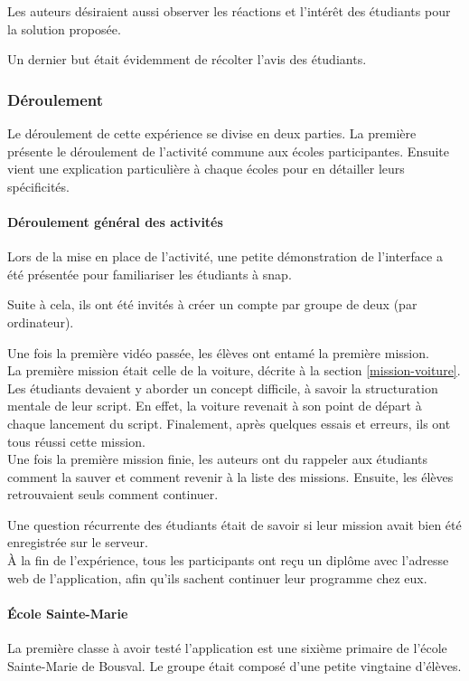 Les auteurs désiraient aussi observer les réactions et l'intérêt des étudiants pour la solution proposée.

Un dernier but était évidemment de récolter l'avis des étudiants.

\subsubsection{Déroulement}
Le déroulement de cette expérience se divise en deux parties. La première présente le déroulement de l'activité commune aux écoles participantes. Ensuite vient une explication particulière à chaque écoles pour en détailler leurs spécificités.
\paragraph{Déroulement général des activités}
Lors de la mise en place de l'activité, une petite démonstration de l'interface a été présentée pour familiariser les étudiants à \gls{snap}.

Suite à cela, ils ont été invités à créer un compte par groupe de deux (par ordinateur).

Une fois la première vidéo passée, les élèves ont entamé la première \gls{mission}.\\

La première \gls{mission} était celle de la voiture, décrite à la section \ref{mission-voiture}. Les étudiants devaient y aborder un concept difficile, à savoir la structuration mentale de leur \gls{script}. En effet, la voiture revenait à son point de départ à chaque lancement du \gls{script}. Finalement, après quelques essais et erreurs, ils ont tous réussi cette \gls{mission}.\\

Une fois la première \gls{mission} finie, les auteurs ont du rappeler aux étudiants comment la sauver et comment revenir à la liste des \glspl{mission}. Ensuite, les élèves retrouvaient seuls comment continuer.

Une question récurrente des étudiants était de savoir si leur \gls{mission} avait bien été enregistrée sur le serveur.\\

À la fin de l'expérience, tous les participants ont reçu un diplôme avec l'adresse web de l'application, afin qu'ils sachent continuer leur programme chez eux.

\paragraph{École Sainte-Marie}
La première classe à avoir testé l'application est une sixième \gls{primaire} de l'école Sainte-Marie de Bousval. Le groupe était composé d'une petite vingtaine d'élèves.

